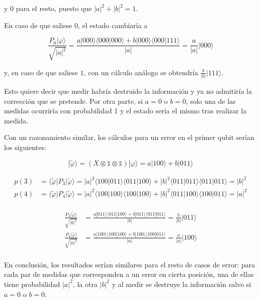 \documentclass{article}
\begin{document}
y $0$ para el resto, puesto que $|a|^2 + |b|^2 = 1$.

En caso de que saliese $0$, el estado cambiaría a 

$$
\frac{P_0|\varphi\rangle}{\sqrt{|a|^2}} 
  = \frac{
    a|000\rangle\langle 000|000\rangle + 
    b|000\rangle\langle 000|111\rangle}{|a|}
  = \frac{a}{|a|}|000\rangle
$$

y, en caso de que saliese $1$, con un cálculo análogo se obtendría
$\frac{b}{|b|}|111\rangle$.

Esto quiere decir que medir habría destruido la información y ya no
admitiría la corrección que se pretende. Por otra parte, si $a = 0$
o $b = 0$, solo una de las medidas ocurriría con probabilidad 1 y el
estado sería el mismo tras realizar la medida.

Con un razonamiento similar, los cálculos para un error en el primer
qubit serían los siguientes:

$$
|\tilde{\varphi}\rangle 
  = (X \otimes \mathbb{1} \otimes \mathbb{1})|\varphi\rangle
  = a|100\rangle + b|011\rangle
$$

\begin{align*}
  p(3) &= \langle\tilde{\varphi}|P_3|\tilde{\varphi}\rangle 
      = |a|^2\langle 100|011\rangle\langle 011|100\rangle 
      + |b|^2\langle 011|011\rangle\langle 011|011\rangle 
      = |b|^2 \\
  p(4) &= \langle\tilde{\varphi}|P_4|\tilde{\varphi}\rangle 
      = |a|^2\langle 100|100\rangle\langle 100|100\rangle 
      + |b|^2\langle 011|100\rangle\langle 100|011\rangle 
      = |a|^2 \\
\end{align*}

\begin{align*}
\frac{P_3|\tilde{\varphi}\rangle}{\sqrt{|b|^2}} 
  &= \frac{
    a|011\rangle\langle 011|100\rangle + 
    b|011\rangle\langle 011|011\rangle}{|b|}
  = \frac{b}{|b|}|011\rangle \\
\frac{P_4|\tilde{\varphi}\rangle}{\sqrt{|a|^2}} 
  &= \frac{
    a|100\rangle\langle 100|100\rangle + 
    b|100\rangle\langle 100|011\rangle}{|a|}
  = \frac{a}{|a|}|100\rangle \\
\end{align*}

En conclusión, los resultados serían similares para el resto de
casos de error: para cada par de medidas que corresponden a un error
en cierta posición, una de ellas tiene probabilidad $|a|^2$, la otra
$|b|^2$ y al medir se destruye la información salvo si $a = 0$ o $b
= 0$.
\end{document}
